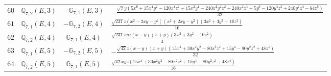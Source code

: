 \documentclass[fleqn,8pt,landscape]{jsarticle}
\begin{document}
\begin{table}[ht!]
\begin{center}
\begin{tabular}{cccl}
$ 60 $ & $ \mathbb{Q}_{7,2}(E,3) $ & $ -\mathbb{G}_{7,1}(E,3) $ & $ - \frac{\sqrt{7} y \left(5 x^{6} + 15 x^{4} y^{2} - 120 x^{4} z^{2} + 15 x^{2} y^{4} - 240 x^{2} y^{2} z^{2} + 240 x^{2} z^{4} + 5 y^{6} - 120 y^{4} z^{2} + 240 y^{2} z^{4} - 64 z^{6}\right)}{32} $ \\
$ 61 $ & $ \mathbb{Q}_{7,1}(E,4) $ & $ -\mathbb{G}_{7,2}(E,4) $ & $ \frac{\sqrt{231} z \left(x^{2} - 2 x y - y^{2}\right) \left(x^{2} + 2 x y - y^{2}\right) \left(3 x^{2} + 3 y^{2} - 10 z^{2}\right)}{16} $ \\
$ 62 $ & $ \mathbb{Q}_{7,2}(E,4) $ & $ \mathbb{G}_{7,1}(E,4) $ & $ \frac{\sqrt{231} x y z \left(x - y\right) \left(x + y\right) \left(3 x^{2} + 3 y^{2} - 10 z^{2}\right)}{4} $ \\
$ 63 $ & $ \mathbb{Q}_{7,1}(E,5) $ & $ -\mathbb{G}_{7,2}(E,5) $ & $ - \frac{\sqrt{42} z \left(x - y\right) \left(x + y\right) \left(15 x^{4} + 30 x^{2} y^{2} - 80 x^{2} z^{2} + 15 y^{4} - 80 y^{2} z^{2} + 48 z^{4}\right)}{32} $ \\
$ 64 $ & $ \mathbb{Q}_{7,2}(E,5) $ & $ \mathbb{G}_{7,1}(E,5) $ & $ \frac{\sqrt{42} x y z \left(15 x^{4} + 30 x^{2} y^{2} - 80 x^{2} z^{2} + 15 y^{4} - 80 y^{2} z^{2} + 48 z^{4}\right)}{16} $ \\
 \hline \hline
\end{tabular}
\end{center}
\end{table}
\end{document}
